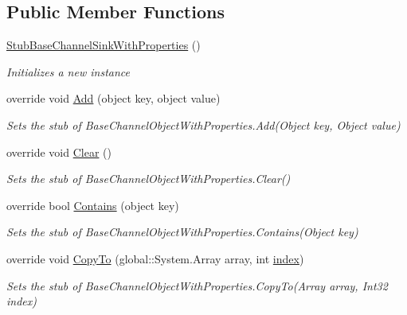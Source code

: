 \subsection*{Public Member Functions}
\begin{DoxyCompactItemize}
\item 
\hyperlink{class_system_1_1_runtime_1_1_remoting_1_1_channels_1_1_fakes_1_1_stub_base_channel_sink_with_properties_a2ec1f68f23ba7f03fafe5d80d766bcdc}{Stub\-Base\-Channel\-Sink\-With\-Properties} ()
\begin{DoxyCompactList}\small\item\em Initializes a new instance\end{DoxyCompactList}\item 
override void \hyperlink{class_system_1_1_runtime_1_1_remoting_1_1_channels_1_1_fakes_1_1_stub_base_channel_sink_with_properties_a87f6ddf570b79544709c0a834b9ca042}{Add} (object key, object value)
\begin{DoxyCompactList}\small\item\em Sets the stub of Base\-Channel\-Object\-With\-Properties.\-Add(\-Object key, Object value)\end{DoxyCompactList}\item 
override void \hyperlink{class_system_1_1_runtime_1_1_remoting_1_1_channels_1_1_fakes_1_1_stub_base_channel_sink_with_properties_a2c734c96d375d0bbe98b6af0f4bd551c}{Clear} ()
\begin{DoxyCompactList}\small\item\em Sets the stub of Base\-Channel\-Object\-With\-Properties.\-Clear()\end{DoxyCompactList}\item 
override bool \hyperlink{class_system_1_1_runtime_1_1_remoting_1_1_channels_1_1_fakes_1_1_stub_base_channel_sink_with_properties_ac455e07871e2a12a444a06b4b5f36528}{Contains} (object key)
\begin{DoxyCompactList}\small\item\em Sets the stub of Base\-Channel\-Object\-With\-Properties.\-Contains(\-Object key)\end{DoxyCompactList}\item 
override void \hyperlink{class_system_1_1_runtime_1_1_remoting_1_1_channels_1_1_fakes_1_1_stub_base_channel_sink_with_properties_a0ec589f235aa44054de318e8e1073ca6}{Copy\-To} (global\-::\-System.\-Array array, int \hyperlink{jquery-1_810_82-vsdoc_8js_a75bb12d1f23302a9eea93a6d89d0193e}{index})
\begin{DoxyCompactList}\small\item\em Sets the stub of Base\-Channel\-Object\-With\-Properties.\-Copy\-To(\-Array array, Int32 index)\end{DoxyCompactList}\item 

\end{DoxyCompactItemize}
